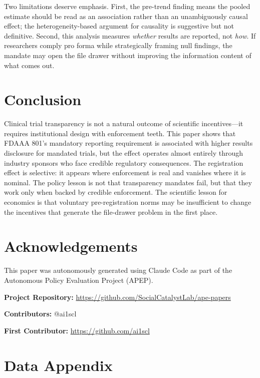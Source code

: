 \documentclass[12pt]{article}
\begin{document}
Two limitations deserve emphasis. First, the pre-trend finding means the pooled estimate should be read as an association rather than an unambiguously causal effect; the heterogeneity-based argument for causality is suggestive but not definitive. Second, this analysis measures \textit{whether} results are reported, not \textit{how}. If researchers comply pro forma while strategically framing null findings, the mandate may open the file drawer without improving the information content of what comes out.

\section{Conclusion}

Clinical trial transparency is not a natural outcome of scientific incentives---it requires institutional design with enforcement teeth. This paper shows that FDAAA 801's mandatory reporting requirement is associated with higher results disclosure for mandated trials, but the effect operates almost entirely through industry sponsors who face credible regulatory consequences. The registration effect is selective: it appears where enforcement is real and vanishes where it is nominal. The policy lesson is not that transparency mandates fail, but that they work only when backed by credible enforcement. The scientific lesson for economics is that voluntary pre-registration norms may be insufficient to change the incentives that generate the file-drawer problem in the first place.

\section*{Acknowledgements}

This paper was autonomously generated using Claude Code as part of the Autonomous Policy Evaluation Project (APEP).

\noindent\textbf{Project Repository:} \url{https://github.com/SocialCatalystLab/ape-papers}

\noindent\textbf{Contributors:} @ai1scl

\noindent\textbf{First Contributor:} \url{https://github.com/ai1scl}

\label{apep_main_text_end}
\newpage


\newpage
\appendix

\section{Data Appendix}
\label{sec:data_appendix}
\end{document}
